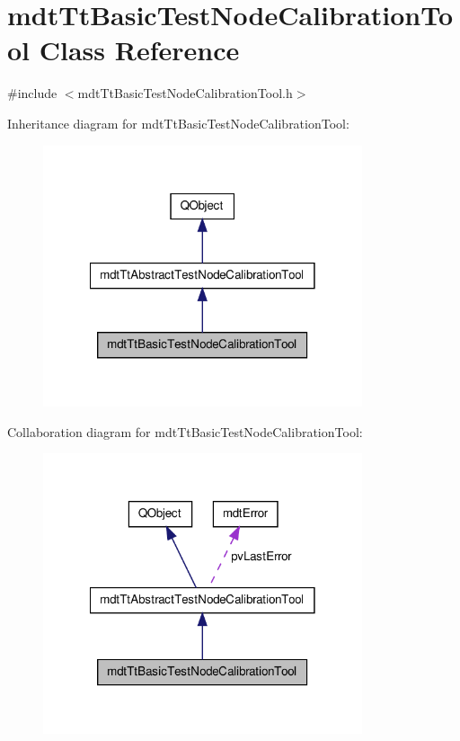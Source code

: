\hypertarget{classmdt_tt_basic_test_node_calibration_tool}{\section{mdt\-Tt\-Basic\-Test\-Node\-Calibration\-Tool Class Reference}
\label{classmdt_tt_basic_test_node_calibration_tool}
}


{\ttfamily \#include $<$mdt\-Tt\-Basic\-Test\-Node\-Calibration\-Tool.\-h$>$}



Inheritance diagram for mdt\-Tt\-Basic\-Test\-Node\-Calibration\-Tool\-:\nopagebreak
\begin{figure}[H]
\begin{center}
\leavevmode
\includegraphics[width=266pt]{classmdt_tt_basic_test_node_calibration_tool__inherit__graph}
\end{center}
\end{figure}


Collaboration diagram for mdt\-Tt\-Basic\-Test\-Node\-Calibration\-Tool\-:\nopagebreak
\begin{figure}[H]
\begin{center}
\leavevmode
\includegraphics[width=266pt]{classmdt_tt_basic_test_node_calibration_tool__coll__graph}
\end{center}
\end{figure}
